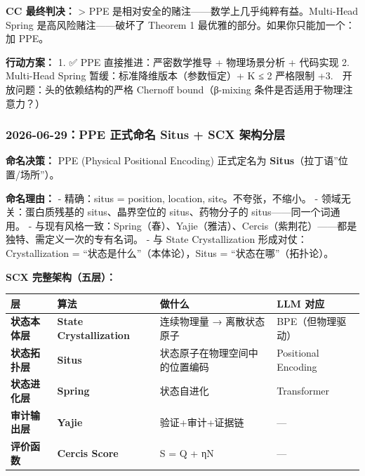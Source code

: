 \documentclass[
  12pt,
]{ctexart}
\begin{document}
\textbf{CC 最终判决：} \textgreater{} PPE
是相对安全的赌注------数学上几乎纯粹有益。Multi-Head Spring
是高风险赌注------破坏了 Theorem 1 最优雅的部分。如果你只能加一个：加
PPE。

\textbf{行动方案：} 1. ✅ PPE 直接推进：严密数学推导 + 物理场景分析 +
代码实现 2. 🔶 Multi-Head Spring 暂缓：标准降维版本（参数恒定）+ K ≤ 2
严格限制 +3. 🔶 开放问题：头的依赖结构的严格 Chernoff bound（β-mixing
条件是否适用于物理注意力？）

\subsubsection{2026-06-29：PPE 正式命名 Situs + SCX
架构分层}\label{ppe-ux6b63ux5f0fux547dux540d-situs-scx-ux67b6ux6784ux5206ux5c42}

\textbf{命名决策：} PPE (Physical Positional Encoding) 正式定名为
\textbf{Situs}（拉丁语''位置/场所''）。

\textbf{命名理由：} - 精确：situs = position, location,
site。不夸张，不缩小。 - 领域无关：蛋白质残基的 situs、晶界空位的
situs、药物分子的 situs------同一个词通用。 -
与现有风格一致：Spring（春）、Yajie（雅洁）、Cercis（紫荆花）------都是独特、需定义一次的专有名词。
- 与 State Crystallization 形成对仗：Crystallization =
``状态是什么''（本体论），Situs = ``状态在哪''（拓扑论）。

\textbf{SCX 完整架构（五层）：}

\begin{longtable}[]{@{}
  >{\raggedright\arraybackslash}p{}
  >{\raggedright\arraybackslash}p{}
  >{\raggedright\arraybackslash}p{}
  >{\raggedright\arraybackslash}p{}@{}}
\toprule\noalign{}
\begin{minipage}[b]{\linewidth}\raggedright
层
\end{minipage} & \begin{minipage}[b]{\linewidth}\raggedright
算法
\end{minipage} & \begin{minipage}[b]{\linewidth}\raggedright
做什么
\end{minipage} & \begin{minipage}[b]{\linewidth}\raggedright
LLM 对应
\end{minipage} \\
\midrule\noalign{}
\endhead
\bottomrule\noalign{}
\endlastfoot
\textbf{状态本体层} & \textbf{State Crystallization} & 连续物理量 →
离散状态原子 & BPE（但物理驱动） \\
\textbf{状态拓扑层} & \textbf{Situs} & 状态原子在物理空间中的位置编码 &
Positional Encoding \\
\textbf{状态进化层} & \textbf{Spring} & 状态自进化 & Transformer \\
\textbf{审计输出层} & \textbf{Yajie} & 验证+审计+证据链 & --- \\
\textbf{评价函数} & \textbf{Cercis Score} & S = Q + ηN & --- \\
\end{longtable}
\end{document}
